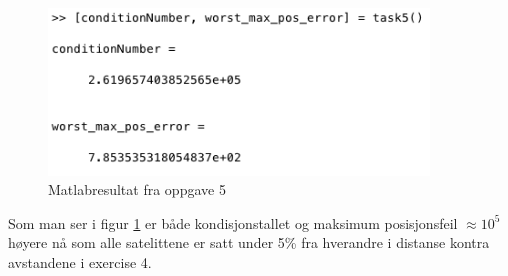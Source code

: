 \begin{figure}[h]
    \centering
    \includegraphics[width=0.9\textwidth]{sections/Exercise5/task5result}
    \caption{Matlabresultat fra oppgave 5}
    \label{fig:task5result}
\end{figure}

Som man ser i figur \ref{fig:task5result} er både kondisjonstallet og maksimum posisjonsfeil $\approx10^5$ høyere nå som alle satelittene er satt under 5\% fra hverandre i distanse kontra avstandene i exercise 4.

